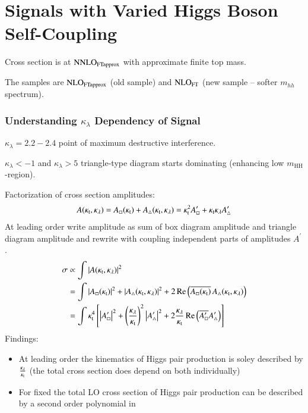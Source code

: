 \section{Signals with Varied Higgs Boson Self-Coupling}

Cross section is at $\text{N}\text{NLO}_\text{FTapprox}$ with approximate finite top mass.

The samples are $\text{NLO}_\text{FTapprox}$ (old sample) and $\text{NLO}_\text{FT}$ (new
sample -- softer $m_{hh}$ spectrum).


\subsubsection{Understanding $\kappa_{\lambda}$ Dependency of Signal}

$\kappa_\lambda = 2.2 - 2.4$ point of maximum destructive interference.

$\kappa_\lambda < -1$ and $\kappa_\lambda > 5$ triangle-type diagram
starts dominating (enhancing low $m_\text{HH}$-region).

Factorization of cross section amplitudes:
\begin{align*}
  A(\kappa_\text{t}, \kappa_{\lambda})
  = A_\square(\kappa_\text{t}) + A_\triangle(\kappa_\text{t}, \kappa_{\lambda})
  = \kappa_\text{t}^2 A_\square^\prime + \kappa_\text{t} \kappa_{\lambda} A_\triangle^\prime
\end{align*}
At leading order write amplitude as sum of box diagram amplitude and
triangle diagram amplitude and rewrite with coupling independent parts
of amplitudes $A^\prime$.
\begin{align*}
  \sigma &\propto \int \left| A(\kappa_\text{t}, \kappa_{\lambda}) \right|^2 \\
         &= \int \left|A_\square(\kappa_\text{t})\right|^2 + \left|A_\triangle(\kappa_\text{t}, \kappa_{\lambda})\right|^2
           + 2 \operatorname{Re}\left( \overline{A_\square(\kappa_\text{t})} \, A_\triangle(\kappa_\text{t}, \kappa_{\lambda}) \right) \\
         &= \int \kappa_\text{t}^4 \left[ \left| A_\square^\prime \right|^2 + \left( \frac{\kappa_{\lambda}}{\kappa_\text{t}}  \right)^2 \left| A_\triangle^\prime \right|^2 + 2 \frac{\kappa_{\lambda}}{\kappa_\text{t}} \operatorname{Re}\left(\overline{A_\square^\prime} A_\triangle^\prime\right) \right]
\end{align*}
Findings:
\begin{itemize}
\item At leading order the kinematics of Higgs pair production is
  soley described by $\frac{\kappa_{\lambda}}{\kappa_\text{t}}$ (the total cross section
  does depend on both individually)

\item For fixed \ktop the total LO cross section of Higgs pair
  production can be described by a second order polynomial in \klambda
\end{itemize}


